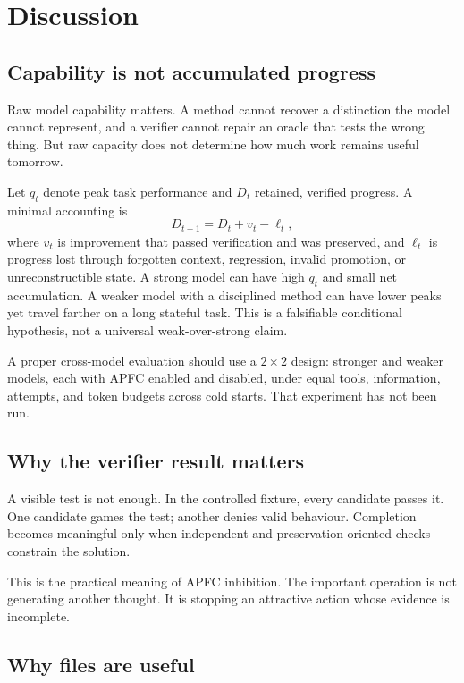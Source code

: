 \documentclass[10pt,twocolumn]{article}
\theoremstyle{definition}
\theoremstyle{plain}
\theoremstyle{remark}
\begin{document}
\section{Discussion}

\subsection{Capability is not accumulated progress}

Raw model capability matters.  A method cannot recover a distinction the model cannot represent, and a verifier cannot repair an oracle that tests the wrong thing.  But raw capacity does not determine how much work remains useful tomorrow.

Let $q_t$ denote peak task performance and $D_t$ retained, verified progress.  A minimal accounting is
\begin{equation}
D_{t+1}=D_t+v_t-\ell_t,
\label{eq:progress}
\end{equation}
where $v_t$ is improvement that passed verification and was preserved, and $\ell_t$ is progress lost through forgotten context, regression, invalid promotion, or unreconstructible state.  A strong model can have high $q_t$ and small net accumulation.  A weaker model with a disciplined method can have lower peaks yet travel farther on a long stateful task.  This is a falsifiable conditional hypothesis, not a universal weak-over-strong claim.

A proper cross-model evaluation should use a $2\times 2$ design: stronger and weaker models, each with APFC enabled and disabled, under equal tools, information, attempts, and token budgets across cold starts.  That experiment has not been run.

\subsection{Why the verifier result matters}

A visible test is not enough.  In the controlled fixture, every candidate passes it.  One candidate games the test; another denies valid behaviour.  Completion becomes meaningful only when independent and preservation-oriented checks constrain the solution.

This is the practical meaning of APFC inhibition.  The important operation is not generating another thought.  It is stopping an attractive action whose evidence is incomplete.

\subsection{Why files are useful}
\end{document}

